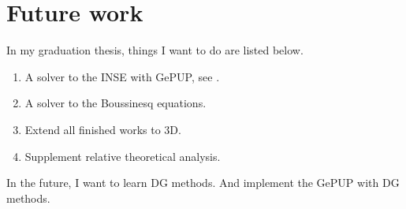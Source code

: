 \documentclass[lang=en,11pt,a4paper,bibend=bibtex]{elegantpaper}
\begin{document}
\section{Future work}

In my graduation thesis, things I want to do are listed below.

\begin{enumerate}
    \item A solver to the INSE with GePUP, see \cite{Zhang2016}.
    \item A solver to the Boussinesq equations.
    \item Extend all finished works to 3D.
    \item Supplement relative theoretical analysis.
\end{enumerate}

In the future, I want to learn DG methods. And implement the GePUP with
DG methods.

\printbibliography[heading=bibintoc,title=\ebibname]

\appendix
\addappheadtotoc
\end{document}
